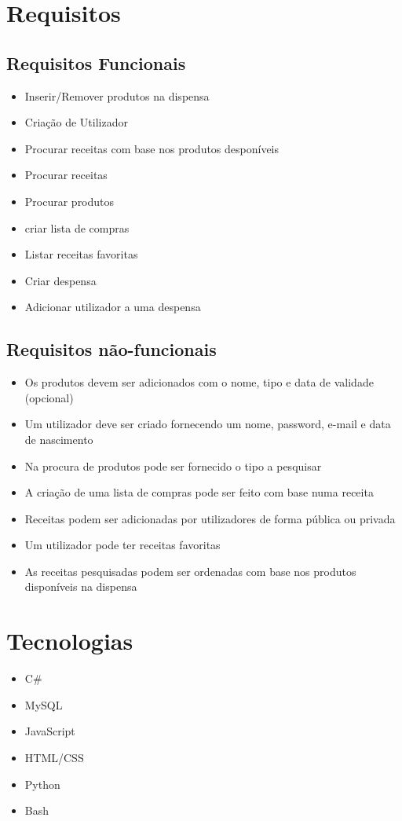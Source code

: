 \documentclass[a4paper]{report}
\begin{document}
\section{Requisitos}
\subsection{Requisitos Funcionais}
\begin{itemize}
    \item Inserir/Remover produtos na dispensa
    \item Criação de Utilizador
    \item Procurar receitas com base nos produtos desponíveis
    \item Procurar receitas
    \item Procurar produtos
    \item criar lista de compras
    \item Listar receitas favoritas
    \item Criar despensa
    \item Adicionar utilizador a uma despensa
\end{itemize}

\subsection{Requisitos não-funcionais}
\begin{itemize}
    \item Os produtos devem ser adicionados com o nome, tipo e data de validade
        (opcional)
    \item Um utilizador deve ser criado fornecendo um nome, password, e-mail e
        data de nascimento
    \item Na procura de produtos pode ser fornecido o tipo a pesquisar
    \item A criação de uma lista de compras pode ser feito com base numa receita
    \item Receitas podem ser adicionadas por utilizadores de forma pública ou
        privada
    \item Um utilizador pode ter receitas favoritas
    \item As receitas pesquisadas podem ser ordenadas com base nos produtos
        disponíveis na dispensa
\end{itemize}

\section{Tecnologias}
\begin{itemize}
    \item C\#
    \item MySQL
    \item JavaScript
    \item HTML/CSS
    \item Python
    \item Bash
\end{itemize}
\end{document}
